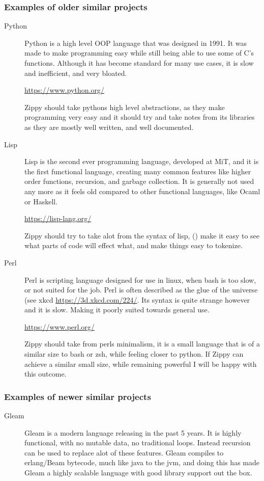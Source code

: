 \documentclass[a4paper,12pt]{article}
\begin{document}
{\subsubsection{Examples of older similar projects}
\begin{description}
	\item[Python] 
		Python is a high level OOP language that was designed in 
		1991. It was made to make programming easy while still being able 
		to use some of C's functions. Although it has become standard for 
		many use cases, it is slow and inefficient, and very bloated.

		\url{https://www.python.org/}

		Zippy should take pythons high level abstractions, as they make 
		programming very easy and it should try and take notes from its 
		libraries as they are mostly well written,
		and well documented.
	\item[Lisp] 
		Lisp is the second ever programming language, developed at MiT, 
		and it is the first functional language, creating many common features 
		like higher order functions, recursion, and garbage collection. It is
		generally not used any more as it feels old compared to other functional
		languages, like Ocaml or Haskell.

		\url{https://lisp-lang.org/}

		Zippy should try to take alot from the syntax of lisp, () make 
		it easy to see what parts of code will effect what, and make 
		things easy to tokenize.
	\item[Perl] 
		Perl is scripting language designed for use in linux, when bash is 
		too slow, or not suited for the job. Perl is often described as the glue 
		of the universe (see xkcd \url{https://3d.xkcd.com/224/}. Its syntax is 
		quite strange however and it is slow. Making it poorly suited towards 
		general use.

		\url{https://www.perl.org/}

		Zippy should take from perls minimalism, it is a small language that is 
		of a similar size to bash or zsh, while feeling closer to python. 
		If Zippy can achieve a similar small size, while remaining
		powerful I will be happy with this outcome.
\end{description}
\subsubsection{Examples of newer similar projects}
\begin{description}
	\item[Gleam] 
		Gleam is a modern language releasing in the past 5 years. It is 
		highly functional, with no mutable data, no traditional loops. 
		Instead recursion can be used to replace alot of these features.
		Gleam compiles to erlang/Beam bytecode, much like java to the
		jvm, and doing this has made Gleam a highly scalable language with 
		good library support out the box.
	

\end{description}}
\end{document}
